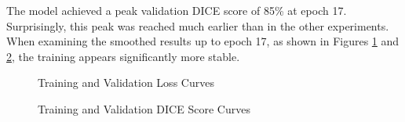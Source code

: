 The model achieved a peak validation DICE score of 85\% at epoch 17. Surprisingly, this peak was reached much earlier 
than in the other experiments. When examining the smoothed results up to epoch 17, as shown in Figures 
\ref{fig:renet50_unfrozen_loss_curve_smooth} and \ref{fig:renet50_unfrozen_dice_curve_smooth}, the 
training appears significantly more stable.

\begin{figure}[ht]
    \centering
    \caption{Training and Validation Loss Curves}
    \label{fig:renet50_unfrozen_loss_curve_smooth}
\end{figure}


\begin{figure}[ht]
    \centering
    \caption{Training and Validation DICE Score Curves}
    \label{fig:renet50_unfrozen_dice_curve_smooth}
\end{figure}
